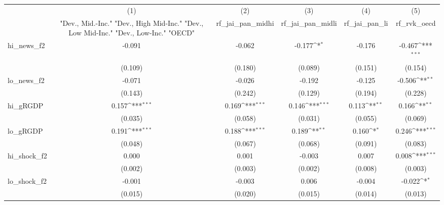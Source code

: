 {
\def\sym#1{\ifmmode^{#1}\else\(^{#1}\)\fi}
\begin{tabular}{l*{5}{c}}
\toprule
            &\multicolumn{1}{c}{(1)}&\multicolumn{1}{c}{(2)}&\multicolumn{1}{c}{(3)}&\multicolumn{1}{c}{(4)}&\multicolumn{1}{c}{(5)}\\
            &\multicolumn{1}{c}{ "Dev., Mid.-Inc." "Dev., High Mid-Inc." "Dev., Low Mid-Inc." "Dev., Low-Inc." "OECD" }&\multicolumn{1}{c}{rf\_jai\_pan\_midhi}&\multicolumn{1}{c}{rf\_jai\_pan\_midli}&\multicolumn{1}{c}{rf\_jai\_pan\_li}&\multicolumn{1}{c}{rf\_rvk\_oecd}\\
\midrule
hi\_news\_f2  &      -0.091         &      -0.062         &      -0.177\sym{*}  &      -0.176         &      -0.467\sym{***}\\
            &     (0.109)         &     (0.180)         &     (0.089)         &     (0.151)         &     (0.154)         \\
\addlinespace
lo\_news\_f2  &      -0.071         &      -0.026         &      -0.192         &      -0.125         &      -0.506\sym{**} \\
            &     (0.143)         &     (0.242)         &     (0.129)         &     (0.194)         &     (0.228)         \\
\addlinespace
hi\_gRGDP    &       0.157\sym{***}&       0.169\sym{***}&       0.146\sym{***}&       0.113\sym{**} &       0.166\sym{**} \\
            &     (0.035)         &     (0.058)         &     (0.031)         &     (0.055)         &     (0.069)         \\
\addlinespace
lo\_gRGDP    &       0.191\sym{***}&       0.188\sym{***}&       0.189\sym{**} &       0.160\sym{*}  &       0.246\sym{***}\\
            &     (0.048)         &     (0.067)         &     (0.068)         &     (0.091)         &     (0.083)         \\
\addlinespace
hi\_shock\_f2 &       0.000         &       0.001         &      -0.003         &       0.007         &       0.008\sym{***}\\
            &     (0.002)         &     (0.003)         &     (0.002)         &     (0.008)         &     (0.003)         \\
\addlinespace
lo\_shock\_f2 &      -0.001         &      -0.003         &       0.006         &      -0.004         &      -0.022\sym{*}  \\
            &     (0.015)         &     (0.020)         &     (0.015)         &     (0.014)         &     (0.013)         \\

\end{tabular}}
